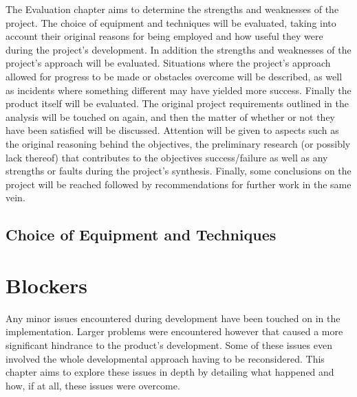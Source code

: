 	The Evaluation chapter aims to determine the strengths and weaknesses of the project. The choice of equipment and techniques will be evaluated, taking into account their original reasons for being employed and how useful they were during the project's development. In addition the strengths and weaknesses of the project's approach will be evaluated. Situations where the project's approach allowed for progress to be made or obstacles overcome will be described, as well as incidents where something different may have yielded more success. Finally the product itself will be evaluated. The original project requirements outlined in the analysis will be touched on again, and then the matter of whether or not they have been satisfied will be discussed. Attention will be given to aspects such as the original reasoning behind the objectives, the preliminary research (or possibly lack thereof) that contributes to the objectives success/failure as well as any strengths or faults during the project's synthesis. Finally, some conclusions on the project will be reached followed by recommendations for further work in the same vein. 
	
		\section{Choice of Equipment and Techniques}
	
	
	
	
	
	
	
	
	
	\chapter{Blockers}
	Any minor issues encountered during development have been touched on in the implementation. Larger problems were encountered however that caused a more significant hindrance to the product's development. Some of these issues even involved the whole developmental approach having to be reconsidered. This chapter aims to explore these issues in depth by detailing what happened and how, if at all, these issues were overcome.
	
